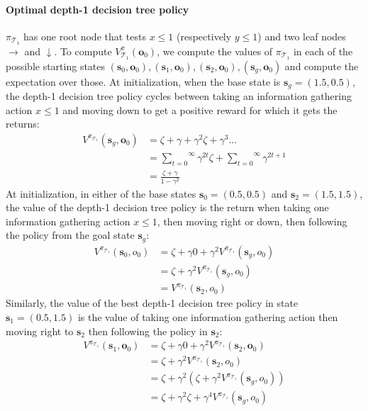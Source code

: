 \paragraph{Optimal depth-1 decision tree policy} $\pi_{\mathcal{T}_1}$ has one root node that tests $x\leq1$ (respectively $y\leq1$) and two leaf nodes $\rightarrow$ and $\downarrow$. 
    To compute $V^\pi_{\mathcal{T}_1}(\boldsymbol{o}_0)$, we compute the values of $\pi_{\mathcal{T}_1}$ in each of the possible starting states $(\boldsymbol{s}_0, \boldsymbol{o}_0), (\boldsymbol{s}_1, \boldsymbol{o}_0), (\boldsymbol{s}_2, \boldsymbol{o}_0), (\boldsymbol{s}_g, \boldsymbol{o}_0)$ and compute the expectation over those. 
    At initialization, when the base state is $\boldsymbol{s}_g = (1.5, 0.5)$, the depth-1 decision tree policy cycles between taking an information gathering action $x\leq1$ and moving down to get a positive reward for which it gets the returns:
    \begin{align*}
        V^{\pi_{\mathcal{T}_1}} (\boldsymbol{s}_g, \boldsymbol{o}_0) &= \zeta + \gamma + \gamma^2 \zeta + \gamma^3 \dots \\
        &= \overset{\infty}{\underset{t=0}\sum} \gamma^{2t} \zeta + \overset{\infty}{\underset{t=0}\sum} \gamma^{2t+1} \\
        &= \frac{\zeta + \gamma}{1 - \gamma^2}
    \end{align*}
    At initialization, in either of the base states $\boldsymbol{s}_0=(0.5,0.5)$ and $\boldsymbol{s}_2=(1.5, 1.5)$, the value of the depth-1 decision tree policy is the return when taking one information gathering action $x\leq1$, then moving right or down, then following the policy from the goal state $\boldsymbol{s}_g$:
    \begin{align*}
        V^{\pi_{\mathcal{T}_1}} (\boldsymbol{s}_0, o_0) &= \zeta + \gamma 0 + \gamma^2 V^{\pi_{\mathcal{T}_1}} (\boldsymbol{s}_g, o_0) \\
        &= \zeta + \gamma^2 V^{\pi_{\mathcal{T}_1}} (\boldsymbol{s}_g, o_0) \\
        &= V^{\pi_{\mathcal{T}_1}} (\boldsymbol{s}_2, o_0)
    \end{align*}
    Similarly, the value of the best depth-1 decision tree policy in state $\boldsymbol{s}_1=(0.5,1.5)$ is the value of taking one information gathering action then moving right to $\boldsymbol{s}_2$ then following the policy in $\boldsymbol{s}_2$:
    \begin{align*}
        V^{\pi_{\mathcal{T}_1}} (\boldsymbol{s}_1, \boldsymbol{o}_0) &= \zeta + \gamma 0 + \gamma^2 V^{\pi_{\mathcal{T}_1}} (\boldsymbol{s}_2, \boldsymbol{o}_0) \\
        &= \zeta + \gamma^2 V^{\pi_{\mathcal{T}_1}} (\boldsymbol{s}_2, o_0) \\
        &= \zeta + \gamma^2 (\zeta + \gamma^2 V^{\pi_{\mathcal{T}_1}} (\boldsymbol{s}_g, o_0)) \\
        &= \zeta + \gamma^2 \zeta + \gamma^4 V^{\pi_{\mathcal{T}_1}} (\boldsymbol{s}_g, o_0)
    \end{align*}
